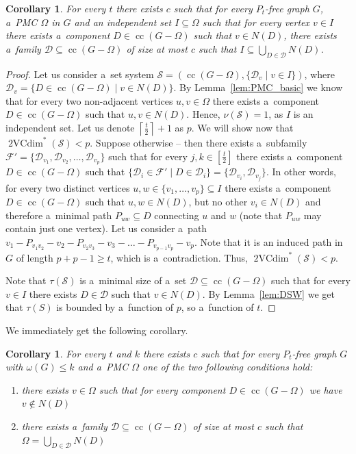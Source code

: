 \documentclass[11pt,a4paper]{article}
\DeclareMathOperator{\VC}{2VCdim}
\DeclareMathOperator{\cc}{cc}
\newtheorem{corollary}[theorem]{Corollary}
\theoremstyle{definition}
\newcommand{\ceil}[1]{\left\lceil #1 \right\rceil }
\begin{document}
\begin{corollary}
    For every $t$ there exists $c$ such that for every $P_t$-free graph $G$, a~PMC $\Omega$ in $G$ and an independent set $I\subseteq \Omega$ such that for every vertex $v\in I$ there exists a~component $D\in \cc(G-\Omega)$ such that $v\in N(D)$, there exists a~family $\mathcal{D}\subseteq \cc(G - \Omega)$ of size at most $c$ such that $I \subseteq \bigcup_{D\in\mathcal{D}} N(D)$. 
\end{corollary}
\begin{proof}
    Let us consider a~set system $\mathcal{S} = (\cc(G-\Omega), \{\mathcal{D}_v\mid v \in I\})$, where $\mathcal{D}_v = \{D\in \cc(G- \Omega)\mid v \in N(D) \}$. 
    By Lemma~\ref{lem:PMC_basic} we know that for every two non-adjacent vertices $u, v\in \Omega$ there exists a~component $D\in \cc(G-\Omega)$ such that $u,v\in N(D)$. Hence, $\nu(\mathcal{S}) = 1$, as $I$ is an independent set. Let us denote $\ceil{\tfrac{t}2}+1$ as $p$. We will show now that $\VC^*(\mathcal{S})< p$. 
    Suppose otherwise -- then there exists a~subfamily $\mathcal{F}'=\{\mathcal{D}_{v_1},\mathcal{D}_{v_2}, \dots, \mathcal{D}_{v_{p}}\}$ such that for every $j,k\in\left[\tfrac{t}2\right]$ there exists a~component $D\in \cc(G-\Omega)$ such that $\{\mathcal{D}_i\in \mathcal{F}'\mid D\in \mathcal{D}_i\}=\{\mathcal{D}_{v_i}, \mathcal{D}_{v_j}\}$. 
    In other words, for every two distinct vertices $u,w\in \{v_1, \dots, v_{p}\}\subseteq I$ there exists a~component $D\in \cc(G-\Omega)$ such that $u, w\in N(D)$, but no other $v_i\in N(D)$ and therefore a~minimal path $P_{uw}\subseteq D$ connecting $u$ and $w$ (note that $P_{uw}$ may contain just one vertex). 
    Let us consider a~path $v_1 - P_{v_1v_2} - v_2 - P_{v_2v_3} - v_3 - \dots - P_{v_{p-1} v_{p}} - v_{p}$. Note that it is an induced path in $G$ of length $p + p - 1 \geq t$, which is a~contradiction. Thus, $\VC^*(\mathcal{S}) < p$.

    Note that $\tau(\mathcal{S})$ is a~minimal size of a~set $\mathcal{D} \subseteq \cc(G-\Omega)$ such that for every $v\in I$ there exists $D\in \mathcal{D}$ such that $v\in N(D)$. By Lemma~\ref{lem:DSW} we get that $\tau(S)$ is bounded by a~function of $p$, so a~function of $t$.     
\end{proof}

We immediately get the following corollary.

\begin{corollary}\label{cor:pmc-cover}
    For every $t$ and $k$ there exists $c$ such that for every $P_t$-free graph $G$ with $\omega(G)\leq k$ and a~PMC $\Omega$ one of the two following conditions hold:
    \begin{enumerate}
        \item there exists $v\in \Omega$ such that for every component $D\in \cc(G-\Omega)$ we have $v\notin N(D)$
        \item there exists a~family $\mathcal{D}\subseteq \cc(G-\Omega)$ of size at most $c$ such that $\Omega=\bigcup_{D\in \mathcal{D}} N(D)$
    \end{enumerate}
\end{corollary}
\end{document}
